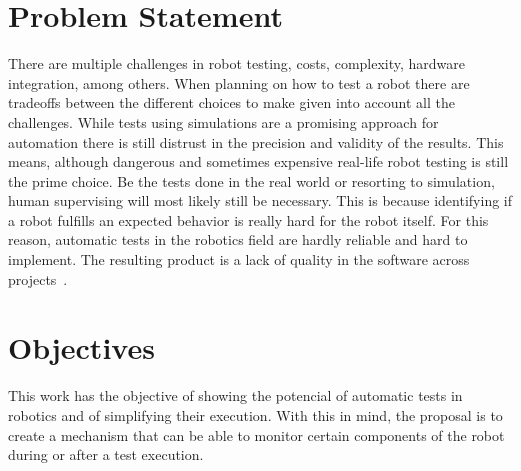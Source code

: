 \section{Problem Statement}
\label{sec:problem}

There are multiple challenges in robot testing, costs, 
complexity, hardware integration, among others.
When planning on how to test a robot there are tradeoffs between the 
different choices to make given into account all the challenges.
While tests using simulations are a promising approach for automation 
there is still distrust in the precision and validity of the results.
This means, although dangerous and sometimes expensive real-life 
robot testing is still the prime choice.
Be the tests done in the real world or resorting to simulation, 
human supervising will most likely still be necessary.
This is because identifying if a robot fulfills an expected 
behavior is really hard for the robot itself.
For this reason, automatic tests in the robotics field are 
hardly reliable and hard to implement.
The resulting product is a lack of quality in the software across projects~\cite{TestRob}.

\section{Objectives}
\label{sec:objectives}

This work has the objective of showing the potencial of automatic 
tests in robotics and of simplifying their execution.
With this in mind, the proposal is to create a mechanism that can be able 
to monitor certain components of the robot during or after a test execution.




